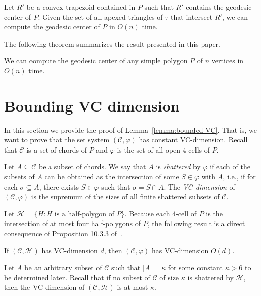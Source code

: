 \documentclass[a4paper,UKenglish]{lipics}
\newcommand{\reg}{\ensuremath{R'}}
\newcommand{\tcell}{4-cell\xspace}
\newcommand{\tcells}{4-cells\xspace}
\begin{document}
\begin{lemma}
Let $\reg$ be a convex trapezoid contained in $P$ such that $\reg$ contains the geodesic center of $P$. 
Given the set of all apexed triangles of $\tau$ that intersect $\reg$, 
we can compute the geodesic center of $P$ in $O(n)$ time.
\end{lemma}

The following theorem summarizes the result presented in this paper.

\begin{theorem}
We can compute the geodesic center of any simple polygon $P$ of $n$ vertices in $O(n)$ time.
\end{theorem}





\appendix
\section{Bounding VC dimension}
In this section we provide the proof of Lemma~\ref{lemma:bounded VC}. That is, we want to prove that the set system $(\mathcal C, \varphi)$ has constant VC-dimension.
Recall that $\mathcal C$ is a set of chords of $P$ and $\varphi$ is the set of all open \tcells of $P$.
 
Let $A \subseteq \mathcal C$ be a subset of chords.
We say that $A$ is \emph{shattered} by $\varphi$ if each of the subsets of $A$ can be obtained as the intersection of some $S\in \varphi$ with $A$, i.e., if for each $\sigma\subseteq A$, there exists $S\in \varphi$ such that $\sigma = S\cap A$. 
The \emph{VC-dimension} of $(\mathcal C, \varphi)$ is the supremum of the sizes of all finite shattered subsets of $\mathcal C$.

Let $\mathcal H = \{H : H\text{ is a half-polygon of }P\}$.
Because each \tcell of $P$ is the intersection of at most four half-polygons of $P$,
the following result is a direct consequence of Proposition 10.3.3 of~\cite[Chapter 10]{matouvsek2002lectures}.

\begin{lemma}\label{lemma:Shattering}
If $(\mathcal C, \mathcal H)$ has VC-dimension $d$, then $(\mathcal C, \varphi)$ has VC-dimension $O(d)$.
\end{lemma}

Let $A$ be an arbitrary subset of $\mathcal C$ such that $|A| = \kappa$ for some constant $\kappa >6$ to be determined later.
Recall that if no subset of $\mathcal C$ of size $\kappa$ is shattered by $\mathcal H$, then the VC-dimension of $(\mathcal C, \mathcal H)$ is at most $\kappa$.
\end{document}
